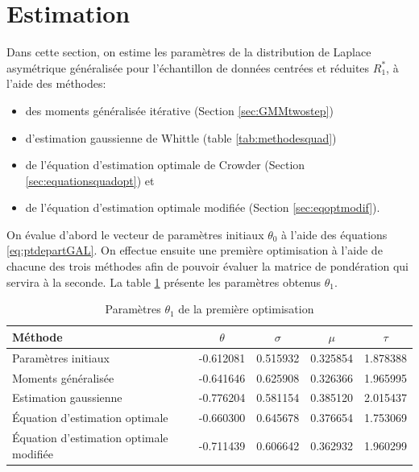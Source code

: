 \section{Estimation}
\label{sec:estimation}

Dans cette section, on estime les paramètres de la distribution de
Laplace asymétrique généralisée pour l'échantillon de données centrées
et réduites $R_1^{*}$, à l'aide des méthodes:
\begin{itemize}
\item des moments généralisée itérative (Section \ref{sec:GMMtwostep})
\item d'estimation gaussienne de Whittle (table
  \ref{tab:methodesquad})
\item de l'équation d'estimation optimale de Crowder (Section
  \ref{sec:equationsquadopt}) et
\item de l'équation d'estimation optimale modifiée (Section
  \ref{sec:eqoptmodif}).
\end{itemize}

On évalue d'abord le vecteur de paramètres initiaux $\theta_0$ à
l'aide des équations \eqref{eq:ptdepartGAL}. On effectue ensuite une
première optimisation à l'aide de chacune des trois méthodes afin de
pouvoir évaluer la matrice de pondération qui servira à la seconde. La
table \ref{tab:premiereoptimR1} présente les paramètres obtenus
$\theta_1$.

\begin{table}[!ht]
  \centering
  \begin{tabular}{lcccc}
    \hline
    \textbf{Méthode} & $\theta$ & $\sigma$ & $\mu$ & $\tau$ \\
    \hline
    Paramètres initiaux & -0.612081 & 0.515932 & 0.325854 & 1.878388 \\
    \hline
    Moments généralisée & -0.641646 & 0.625908 & 0.326366 & 1.965995 \\
    Estimation gaussienne & -0.776204 & 0.581154 & 0.385120 & 2.015437 \\
    Équation d'estimation optimale & -0.660300 & 0.645678 & 0.376654 & 1.753069 \\
    Équation d'estimation optimale modifiée & -0.711439 & 0.606642 & 0.362932 & 1.960299 \\
    \hline
  \end{tabular}
  \caption{Paramètres $\theta_1$ de la première optimisation}
  \label{tab:premiereoptimR1}
\end{table}

